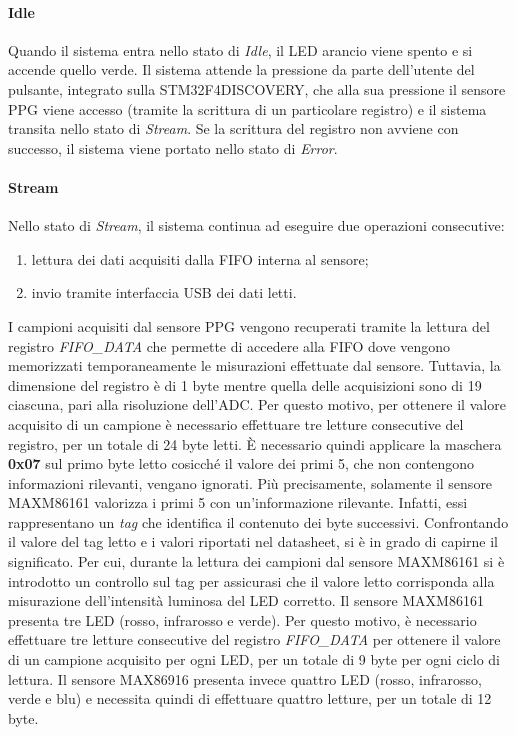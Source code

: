 \paragraph{Idle}
Quando il sistema entra nello stato di \textit{Idle}, il LED arancio viene spento e si accende quello verde. Il sistema attende la pressione da parte dell'utente del pulsante, integrato sulla STM32F4DISCOVERY, che alla sua pressione il sensore PPG viene accesso (tramite la scrittura di un particolare registro) e il sistema transita nello stato di \textit{Stream}. Se la scrittura del registro non avviene con successo, il sistema viene portato nello stato di \textit{Error}.
\paragraph{Stream}
Nello stato di \textit{Stream}, il sistema continua ad eseguire due operazioni consecutive:
\begin{enumerate}
	\item lettura dei dati acquisiti dalla FIFO interna al sensore;
	\item invio tramite interfaccia USB dei dati letti.
\end{enumerate}
I campioni acquisiti dal sensore PPG vengono recuperati tramite la lettura del registro \textit{FIFO\_DATA} che permette di accedere alla FIFO dove vengono memorizzati temporaneamente le misurazioni effettuate dal sensore. Tuttavia, la dimensione del registro è di 1 byte mentre quella delle acquisizioni sono di \SI{19}{\bit} ciascuna, pari alla risoluzione dell'ADC. Per questo motivo, per ottenere il valore acquisito di un campione è necessario effettuare tre letture consecutive del registro, per un totale di 24 byte letti. \`E necessario quindi applicare la maschera \textbf{0x07} sul primo byte letto cosicché il valore dei primi \SI{5}{\bit}, che non contengono informazioni rilevanti, vengano ignorati. Più precisamente, solamente il sensore MAXM86161 valorizza i primi \SI{5}{\bit} con un'informazione rilevante. Infatti, essi rappresentano un \textit{tag} che identifica il contenuto dei byte successivi. Confrontando il valore del tag letto e i valori riportati nel datasheet, si è in grado di capirne il significato. Per cui, durante la lettura dei campioni dal sensore MAXM86161 si è introdotto un controllo sul tag per assicurasi che il valore letto corrisponda alla misurazione dell'intensità luminosa del LED corretto. Il sensore MAXM86161 presenta tre LED (rosso, infrarosso e verde). Per questo motivo, è necessario effettuare tre letture consecutive del registro \textit{FIFO\_DATA} per ottenere il valore di un campione acquisito per ogni LED, per un totale di 9 byte per ogni ciclo di lettura. Il sensore MAX86916 presenta invece quattro LED (rosso, infrarosso, verde e blu) e necessita quindi di effettuare quattro letture, per un totale di 12 byte.

